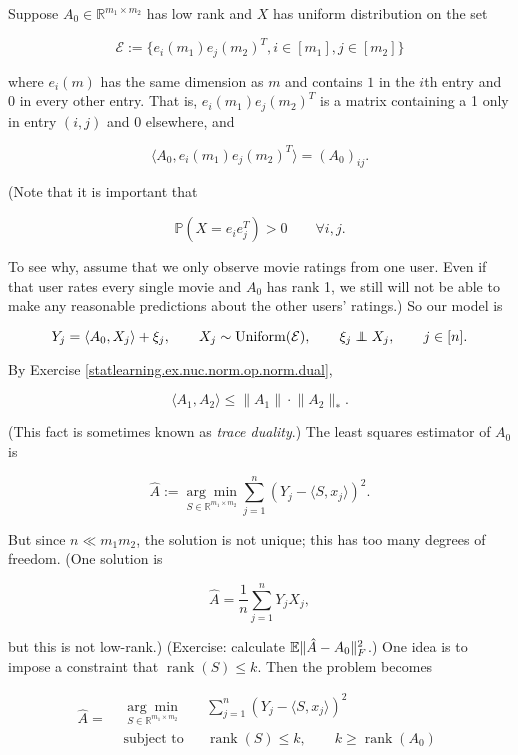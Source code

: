 \begin{example}

Suppose \(A_0 \in \mathbb{R}^{m_1 \times m_2}\) has low rank and \(X\) has uniform distribution on the set

\[
\mathcal{E} := \{e_i (m_1) e_j (m_2)^T, i \in [m_1], j \in [m_2]\}
\]

where \(e_i(m) \) has the same dimension as \(m\) and contains \(1\) in the \(i\)th entry and 0 in every other entry. That is, \(e_i (m_1) e_j(m_2)^T\) is a matrix containing a 1 only in entry \((i,j)\) and 0 elsewhere, and 

\[
\langle A_0, e_i(m_1) e_j(m_2)^T \rangle = ( A_0)_{ij}.
\]

(Note that it is important that 

\[
\mathbb{P}(X = e_i e_j^T) > 0 \qquad \forall i , j.
\]

To see why, assume that we only observe movie ratings from one user. Even if that user rates every single movie and \(A_0\) has rank 1, we still will not be able to make any reasonable predictions about the other users' ratings.) So our model is

\[
Y_j = \langle A_0, X_j \rangle + \xi_j, \qquad X_j \sim \operatorname{Uniform}(\mathcal{E}), \qquad \xi_j \indep X_j, \qquad j \in [n].
\]

By Exercise \ref{statlearning.ex.nuc.norm.op.norm.dual}, 

\[
\langle A_1, A_2 \rangle \leq \lVert A_1 \rVert \cdot \lVert A_2 \rVert_*.
\]

(This fact is sometimes known as \textit{trace duality}.) The least squares estimator of \(A_0\) is 

\[
\hat{A} := \underset{S \in \mathbb{R}^{m_1 \times m_2}}{\arg \min} \sum_{j=1}^n (Y_j - \langle S, x_j \rangle )^2.
\]

But since \(n \ll m_1 m_2\), the solution is not unique; this has too many degrees of freedom. (One solution is

\[
\hat{A} = \frac{1}{n} \sum_{j=1}^n Y_j X_j,
\]

but this is not low-rank.) (Exercise: calculate \(\mathbb{E} \lVert \hat{A} - A_0 \rVert_F^2\).)  One idea is to impose a constraint that \(\operatorname{rank}(S) \leq k\). Then the problem becomes

\[
\hat{A} = \begin{aligned}
& \underset{S \in \mathbb{R}^{m_1 \times m_2}}{\arg \min} 
& & \sum_{j=1}^n (Y_j - \langle S, x_j \rangle )^2 \\
& \text{subject to}
& & \operatorname{rank}(S) \leq k , \qquad k \geq \operatorname{rank}(A_0)
\end{aligned}
\]


\end{example}
